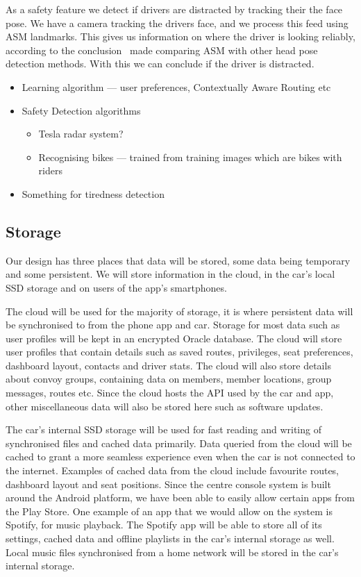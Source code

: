 \documentclass{article}
\begin{document}
As a safety feature we detect if drivers are distracted by tracking their the face pose. We have a camera tracking the drivers face, and we process this feed using ASM landmarks. This gives us information on where the driver is looking reliably, according to the conclusion~\cite{head-pose} made comparing ASM with other head pose detection methods. With this we can conclude if the driver is distracted.

\begin{itemize}
  \item Learning algorithm --- user preferences, Contextually Aware Routing etc
  \item Safety Detection algorithms
    \begin{itemize}
      \item Tesla radar system?
      \item Recognising bikes --- trained from training images which are bikes with riders
    \end{itemize}
  \item Something for tiredness detection
\end{itemize}

\subsection{Storage}\label{ssec:storage} %
Our design has three places that data will be stored, some data being temporary and some persistent. We will store information in the cloud, in the car's local SSD storage and on users of the app's smartphones.

The cloud will be used for the majority of storage, it is where persistent data will be synchronised to from the phone app and car. Storage for most data such as user profiles will be kept in an encrypted Oracle database. The cloud will store user profiles that contain details such as saved routes, privileges, seat preferences, dashboard layout, contacts and driver stats. The cloud will also store details about convoy groups, containing data on members, member locations, group messages, routes etc. Since the cloud hosts the API used by the car and app, other miscellaneous data will also be stored here such as software updates.

The car's internal SSD storage will be used for fast reading and writing of synchronised files and cached data primarily. Data queried from the cloud will be cached to grant a more seamless experience even when the car is not connected to the internet. Examples of cached data from the cloud include favourite routes, dashboard layout and seat positions. Since the centre console system is built around the Android platform, we have been able to easily allow certain apps from the Play Store. One example of an app that we would allow on the system is Spotify, for music playback. The Spotify app will be able to store all of its settings, cached data and offline playlists in the car's internal storage as well. Local music files synchronised from a home network will be stored in the car's internal storage. 
\end{document}
